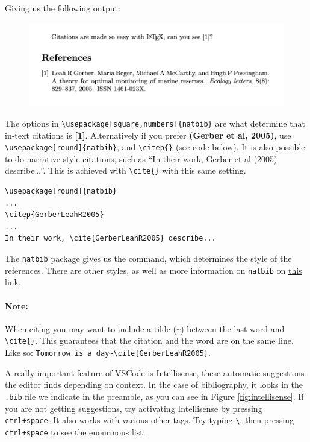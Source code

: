 Giving us the following output:
\begin{figure}[h]
  \centering
    \includegraphics[]{figures/references.png}
  \label{fig:references}
\end{figure}

The options in \verb|\usepackage[square,numbers]{natbib}| are what determine that in-text citations is \textbf{[1]}.
Alternatively if you prefer \textbf{(Gerber et al, 2005)}, use \verb|\usepackage[round]{natbib}|, and \verb|\citep{}| (see code below).
It is also possible to do narrative style citations, such as ``In their work, Gerber et al (2005) describe\dots''. This is achieved with \verb|\cite{}| with this same setting.

\begin{lstlisting}
\usepackage[round]{natbib}
...
\citep{GerberLeahR2005}
...
In their work, \cite{GerberLeahR2005} describe...
\end{lstlisting}

The \verb|natbib| package gives us the \verb|| command, which determines the style of the references.
There are other styles, as well as more information on \verb|natbib| on \href{https://ftp.eq.uc.pt/software/TeX/macros/latex/contrib/natbib/natnotes.pdf}{this} link. 

\paragraph{Note:}
When citing you may want to include a tilde (\verb|~|) between the last word and \verb|\cite{}|. This guarantees that the citation and the word are on the same line. Like so: \verb|Tomorrow is a day~\cite{GerberLeahR2005}|.

A really important feature of VSCode is Intellisense, these automatic suggestions the editor finds depending on context.
In the case of bibliography, it looks in the \verb|.bib| file we indicate in the preamble, as you can see in Figure \ref{fig:intellisense}.
If you are not getting suggestions, try activating Intellisense by pressing \verb|ctrl+space|.
It also works with various other tags. Try typing \texttt{\textbackslash}, then pressing \verb|ctrl+space| to see the enourmous list.

